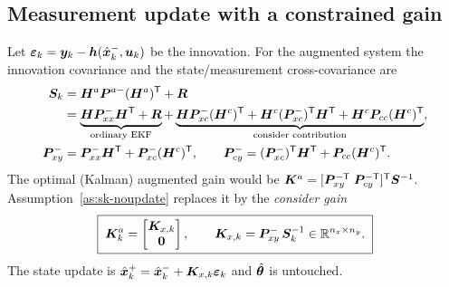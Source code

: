 \subsection{Measurement update with a constrained gain}
Let $\bm{\varepsilon}_k = \bm{y}_k - \bm{h}(\hat{\bm{x}}^{-}_k,\bm{u}_k)$ be the innovation.  For the augmented system the
innovation covariance and the state/measurement cross-covariance are
\begin{align}
\bm{S}_k &= \bm{H}^a\bm{P}^{a-}(\bm{H}^a)^{\mathsf{T}} + \bm{R} \nonumber\\
      &= \underbrace{\bm{H}\bm{P}^-_{xx}\bm{H}^{\mathsf{T}} + \bm{R}}_{\text{ordinary EKF}}
       + \underbrace{\bm{H}\bm{P}^-_{xc}(\bm{H}^{c})^{\mathsf{T}} + \bm{H}^{c}(\bm{P}^-_{xc})^{\mathsf{T}}\bm{H}^{\mathsf{T}}
        + \bm{H}^{c}\bm{P}_{cc}(\bm{H}^{c})^{\mathsf{T}}}_{\text{consider contribution}}, \label{eq:sk-S}\\
\bm{P}^-_{xy} &= \bm{P}^-_{xx}\bm{H}^{\mathsf{T}} + \bm{P}^-_{xc}(\bm{H}^{c})^{\mathsf{T}}, \qquad
\bm{P}^-_{cy} = (\bm{P}^-_{xc})^{\mathsf{T}}\bm{H}^{\mathsf{T}} + \bm{P}_{cc}(\bm{H}^{c})^{\mathsf{T}}. \label{eq:sk-Pxy}
\end{align}
The optimal (Kalman) augmented gain would be
$\bm{K}^a=[\bm{P}^{-\mathsf{T}}_{xy}\;\bm{P}^{-\mathsf{T}}_{cy}]^{\mathsf{T}}\bm{S}^{-1}$.  Assumption~\ref{as:sk-noupdate} replaces it
by the \emph{consider gain}
\begin{equation}
\boxed{\;\bm{K}^a_k = \begin{bmatrix}\bm{K}_{x,k}\\ \bm 0\end{bmatrix},\qquad
\bm{K}_{x,k} = \bm{P}^-_{xy}\,\bm{S}_k^{-1}\in\mathbb{R}^{n_x\times n_y}.\;}
\label{eq:sk-gain}
\end{equation}
The state update is $\hat{\bm{x}}^{+}_k = \hat{\bm{x}}^{-}_k + \bm{K}_{x,k}\bm{\varepsilon}_k$ and $\hat{\bm{\theta}}$ is untouched.

